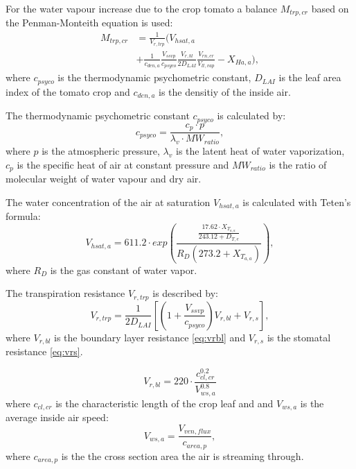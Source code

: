 For the water vapour increase due to the crop tomato a balance $M_{trp,cr}$ based on the Penman-Monteith equation is used:
\begin{equation}\label{eq:crtp}
\begin{split}
M_{trp,cr} &= \frac{1}{V_{r,trp}}\Big(V_{hsat,a} \\
           &+ \frac{1}{c_{den,a}}\frac{V_{ssvp}}{c_{psyco}}\frac{V_{r,bl}}{2D_{LAI}}\frac{V_{rn,cr}}{V_{lt,vap}}-X_{Ha,a} \Big),
\end{split}
\end{equation}
where $c_{psyco}$ is the thermodynamic psychometric constant, $D_{LAI}$ is the leaf area index of the tomato crop and $c_{den,a}$ is the densitiy of the inside air.

The thermodynamic psychometric constant $c_{psyco}$ is calculated by:
\begin{equation}\label{eq:psyco}
c_{psyco} = \frac{c_p \cdot p}{\lambda_v \cdot MW_{ratio}},
\end{equation}
where $p$ is the atmospheric pressure, $\lambda_v$ is the latent heat of water vaporization, $c_p$ is the specific heat of air at constant pressure and $MW_{ratio}$ is the ratio of molecular weight of water vapour and dry air.

The water concentration of the air at saturation $V_{hsat,a}$ is calculated with Teten's formula:
\begin{equation}\label{eq:vhsat}
V_{hsat,a} = 611.2 \cdot exp\left({\frac{\frac{17.62 \cdot X_{T_{a,a}}}{243.12 + D_{T,e}}}{R_D \left(273.2 + X_{T_{a,a}}\right)}}\right),
\end{equation} where $R_D$ is the gas constant of water vapor.

The transpiration resistance $V_{r,trp}$ is described by:
\begin{equation}\label{eq:vrtrp}
V_{r,trp} = \frac{1}{2D_{LAI}}\left[\left(1+\frac{V_{ssvp}}{c_{psyco}}\right)V_{r,bl}+V_{r,s}\right],
\end{equation}
where $V_{r,bl}$ is the boundary layer resistance \cref{eq:vrbl} and $V_{r,s}$ is the stomatal resistance \cref{eq:vrs}.

\begin{equation}\label{eq:vrbl}
V_{r,bl} = 220 \cdot \frac{c_{cl,cr}^{0.2}}{V_{ws,a}^{0.8}}
\end{equation}
where $c_{cl,cr}$ is the characteristic length of the crop leaf and and $V_{ws,a}$ is the average inside air speed:
\begin{equation}\label{eq:airspeed}
V_{ws,a} = \frac{V_{ven,flux}}{c_{area,p}},
\end{equation}
where $c_{area,p}$ is the the cross section area the air is streaming through. 

